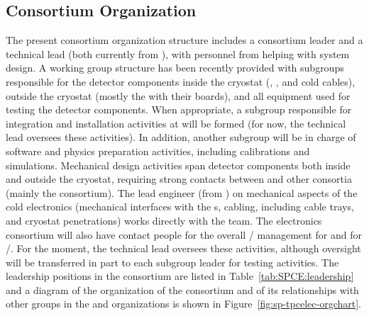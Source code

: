 \subsection{Consortium Organization}
\label{sec:fdsp-tpcelec-management-consort}

The present consortium organization
structure includes a consortium leader and a technical lead (both currently
from ), with personnel from  helping with system design. A working group structure has been recently 
provided with subgroups responsible for the detector 
components inside the cryostat (, , and
cold cables), outside the cryostat (mostly the  with 
their boards), and all equipment
used for testing the detector components. When appropriate, a subgroup
responsible for integration and installation activities at
 will be formed (for now, the technical lead oversees 
these activities). In addition,
another subgroup will be in charge of software and physics
preparation activities, including calibrations and simulations.
Mechanical design activities span detector components both inside
and outside the cryostat, requiring strong contacts between 
 and other consortia (mainly the 
consortium). The lead engineer (from ) on mechanical aspects of the cold
electronics (mechanical interfaces with the s, cabling, including 
cable trays, and cryostat penetrations) works directly with
the  team. The  electronics consortium will also have 
contact people for the overall / management for
 and for /. For the moment, the technical lead oversees these activities, although oversight
will be transferred in part to each subgroup leader for testing
activities. The leadership positions in the consortium 
are listed in Table~\ref{tab:SPCE:leadership} and a diagram of
the organization of the consortium and of its relationships
with other groups in the  and  organizations
is shown in Figure~\ref{fig:sp-tpcelec-orgchart}.


